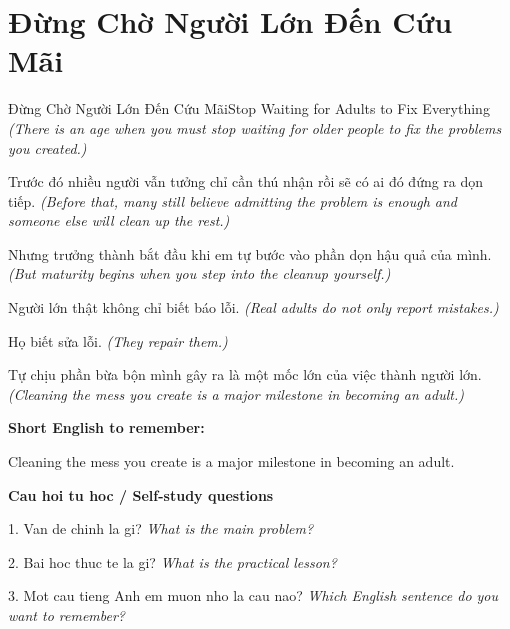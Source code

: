 \section{Đừng Chờ Người Lớn Đến Cứu Mãi}
\begin{truyen}{Đừng Chờ Người Lớn Đến Cứu Mãi}{Stop Waiting for Adults to Fix Everything}
\textit{(There is an age when you must stop waiting for older people to fix the problems you created.)}

Trước đó nhiều người vẫn tưởng chỉ cần thú nhận rồi sẽ có ai đó đứng ra dọn tiếp.
\textit{(Before that, many still believe admitting the problem is enough and someone else will clean up the rest.)}

Nhưng trưởng thành bắt đầu khi em tự bước vào phần dọn hậu quả của mình.
\textit{(But maturity begins when you step into the cleanup yourself.)}

Người lớn thật không chỉ biết báo lỗi.
\textit{(Real adults do not only report mistakes.)}

Họ biết sửa lỗi.
\textit{(They repair them.)}

\end{truyen}

\begin{baihoc}
Tự chịu phần bừa bộn mình gây ra là một mốc lớn của việc thành người lớn.
\textit{(Cleaning the mess you create is a major milestone in becoming an adult.)}
\end{baihoc}

\begin{ghinhoanh}
\textbf{Short English to remember:}

Cleaning the mess you create is a major milestone in becoming an adult.

\end{ghinhoanh}

\begin{tuhocnhanh}
\textbf{Cau hoi tu hoc / Self-study questions}

1. Van de chinh la gi? \textit{What is the main problem?}

2. Bai hoc thuc te la gi? \textit{What is the practical lesson?}

3. Mot cau tieng Anh em muon nho la cau nao? \textit{Which English sentence do you want to remember?}
\end{tuhocnhanh}
\ngancach

